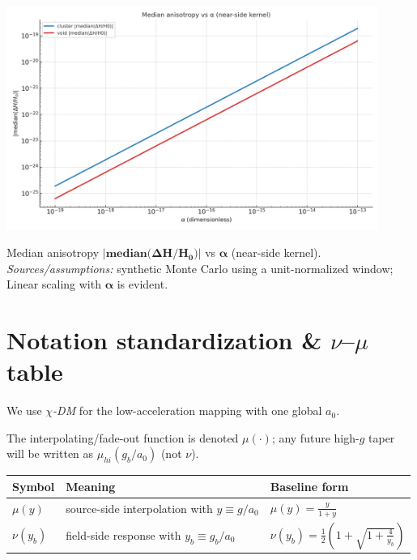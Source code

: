 \documentclass[
]{article}
\begin{document}
\includegraphics[width=4.78333in,height=2.87in,alt={A graph with a red line AI-generated content may be incorrect.}]{letter_media/media/image4.png}

Median anisotropy
\(\mathbf{|median(\Delta}\mathbf{H}\mathbf{/}\mathbf{H}_{\mathbf{0}}\mathbf{)|}\)
vs \(\mathbf{\alpha}\) (near-side kernel). \emph{Sources/assumptions:}
synthetic Monte Carlo using a unit-normalized window; Linear scaling
with \(\mathbf{\alpha}\) is evident.

\section{\texorpdfstring{Notation standardization \& \(\nu\)--\(\mu\)
table}{Notation standardization \& \textbackslash nu--\textbackslash mu table}}\label{notation-standardization-numu-table}

We use \(\chi\)\emph{-DM} for the low-acceleration mapping with one
global \(a_{0}\).

The interpolating/fade-out function is denoted \(\mu( \cdot )\); any
future high-\(g\) taper will be written as \(\mu_{hi}(g_{b}/a_{0})\)
(not \(\nu\)).

\begin{longtable}[]{@{}
  >{\raggedright\arraybackslash}p{}
  >{\raggedright\arraybackslash}p{}
  >{\raggedright\arraybackslash}p{}@{}}
\toprule\noalign{}
\begin{minipage}[b]{\linewidth}\raggedright
Symbol
\end{minipage} & \begin{minipage}[b]{\linewidth}\raggedright
Meaning
\end{minipage} & \begin{minipage}[b]{\linewidth}\raggedright
Baseline form
\end{minipage} \\
\midrule\noalign{}
\endhead
\bottomrule\noalign{}
\endlastfoot
\(\mu(y)\) & source-side interpolation with \(y \equiv g/a_{0}\) &
\(\mu(y) = \frac{y}{1 + y}\) \\
\(\nu(y_{b})\) & field-side response with \(y_{b} \equiv g_{b}/a_{0}\) &
\(\nu(y_{b}) = \frac{1}{2}\left( 1 + \sqrt{1 + \frac{4}{y_{b}}} \right)\) \\
\end{longtable}
\end{document}
